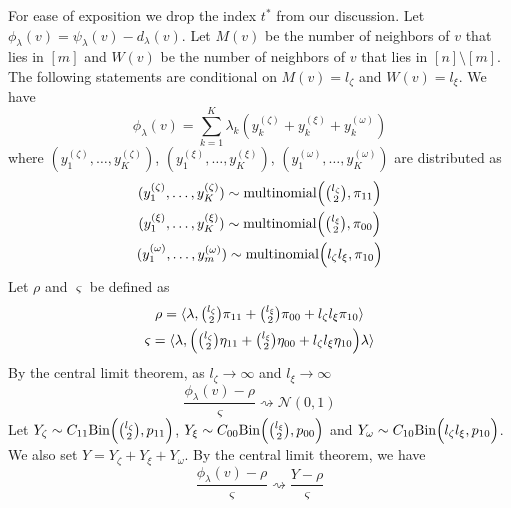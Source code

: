 \documentclass[final]{IEEEtran}
\theoremstyle{definition}
\begin{document}
\begin{IEEEproof}
  For ease of exposition we drop the index $t^{*}$ from our discussion. Let
  $\phi_{\lambda}(v) = \psi_{\lambda}(v) - d_{\lambda}(v)$. Let
  $M(v)$ be the number of neighbors of $v$ that lies in $[m]$ and
  $W(v)$ be the number of neighbors of $v$ that lies in $[n]
\setminus [m]$. The following statements are conditional on
$M(v) = l_{\zeta}$ and $W(v) = l_{\xi}$. We have
\begin{equation}
  \phi_{\lambda}(v) = \sum_{k=1}^{K} \lambda_k ( y^{(\zeta)}_k +
  y^{(\xi)}_k + y^{(\omega)}_k)
\end{equation}
where $(y^{(\zeta)}_1, \dots, y^{(\zeta)}_K)$, $(y^{(\xi)}_1,\dots,
 y^{(\xi)}_K)$,  $(y^{(\omega)}_1, \dots, y^{(\omega)}_K)$ are
 distributed as
\begin{gather*}
(y^{(\zeta)}_1,\dots,y^{(\zeta)}_K) \sim \textrm{multinomial}\Bigl(
\tbinom{l_\zeta}{2}, \pi_{11}\Bigr) \\ 
(y^{(\xi)}_1,\dots,y^{(\xi)}_K) \sim \textrm{multinomial}\Bigl(
\tbinom{l_\xi}{2}, \pi_{00}\Bigr) \\
(y^{(\omega)}_1,\dots,y^{(\omega)}_m) \sim \textrm{multinomial}\Bigl(
l_\zeta l_\xi, \pi_{10}\Bigr)
\end{gather*}
Let $\rho$ and $\varsigma$ be defined as
\begin{gather*}
  \rho = \langle \lambda, \tbinom{l_{\zeta}}{2} \pi_{11} +
  \tbinom{l_{\xi}}{2} \pi_{00} + l_{\zeta} l_{\xi} \pi_{10} \rangle \\
  \varsigma = \langle \lambda, \Bigl(\tbinom{l_{\zeta}}{2} \eta_{11} +
  \tbinom{l_{\xi}}{2} \eta_{00} + l_{\zeta} l_{\xi} \eta_{10}\Bigr) \lambda
  \rangle
\end{gather*}
By the central limit theorem, as $l_{\zeta} \rightarrow
\infty$ and $l_{\xi} \rightarrow \infty$
\begin{equation}
  \label{eq:16}
  \frac{\phi_{\lambda}(v) - \rho}{\varsigma} \rightsquigarrow
  \mathcal{N}(0,1)
\end{equation}
Let $Y_{\zeta} \sim C_{11} \mathrm{Bin}\Bigl(\tbinom{l_{\zeta}}{2},
p_{11}\Bigr)$, $Y_{\xi} \sim C_{00} \mathrm{Bin}\Bigl(\tbinom{l_\xi}{2},
p_{00}\Bigr)$ and $Y_{\omega} \sim C_{10} \mathrm{Bin}\Bigl( l_{\zeta}
l_{\xi}, p_{10} \Bigr)$. We also set $Y = Y_{\zeta} + Y_{\xi} +
Y_{\omega}$. By the central limit theorem, we have
\begin{equation}
  \label{eq:21}
 \frac{\phi_{\lambda}(v) - \rho}{\varsigma} \rightsquigarrow
 \frac{Y - \rho}{\varsigma}
\end{equation}

\end{IEEEproof}
\end{document}
